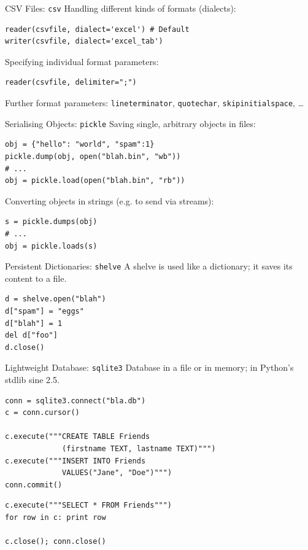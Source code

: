 \begin{frame}[fragile]{CSV Files: \texttt{csv}}
Handling different kinds of formats (dialects):
\begin{lstlisting}[style=Python]
reader(csvfile, dialect='excel') # Default
writer(csvfile, dialect='excel_tab')
\end{lstlisting}
\vspace*{3mm}
Specifying individual format parameters:
\begin{lstlisting}[style=Python]
reader(csvfile, delimiter=";")
\end{lstlisting}
Further format parameters: \texttt{lineterminator}, \texttt{quotechar}, \texttt{skipinitialspace}, \dots
\end{frame}

\begin{frame}[fragile]{Serialising Objects: \texttt{pickle}}
Saving single, arbitrary objects in files:
\begin{lstlisting}[style=Python]
obj = {"hello": "world", "spam":1}
pickle.dump(obj, open("blah.bin", "wb"))
# ...
obj = pickle.load(open("blah.bin", "rb"))
\end{lstlisting}
Converting objects in strings (e.g. to send via streams):
\begin{lstlisting}[style=Python]
s = pickle.dumps(obj)
# ...
obj = pickle.loads(s)
\end{lstlisting}
\end{frame}

\begin{frame}[fragile]{Persistent Dictionaries: \texttt{shelve}}
A shelve is used like a dictionary; it saves its content to a file.
\begin{lstlisting}[style=Python]
d = shelve.open("blah")
d["spam"] = "eggs"
d["blah"] = 1
del d["foo"]   
d.close()  
\end{lstlisting}
\end{frame}

\begin{frame}[fragile]{Lightweight Database: \texttt{sqlite3}}
Database in a file or in memory; in Python's stdlib sine 2.5.
\begin{lstlisting}[style=Python]
conn = sqlite3.connect("bla.db")
c = conn.cursor()

c.execute("""CREATE TABLE Friends
             (firstname TEXT, lastname TEXT)""")
c.execute("""INSERT INTO Friends
             VALUES("Jane", "Doe")""")
conn.commit()
\end{lstlisting}
\begin{lstlisting}[style=Python]
c.execute("""SELECT * FROM Friends""")
for row in c: print row

c.close(); conn.close()
\end{lstlisting}
\end{frame}

